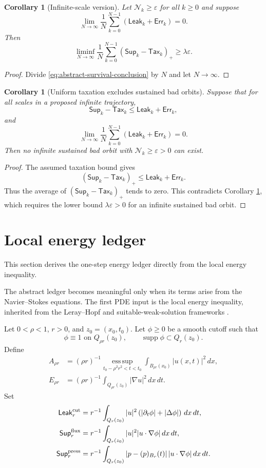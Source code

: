 \documentclass[11pt]{article}
\numberwithin{equation}{section}
\newtheorem{corollary}[theorem]{Corollary}
\newcommand{\eps}{\varepsilon}
\newcommand{\Supp}{\mathsf{Sup}}
\newcommand{\Tax}{\mathsf{Tax}}
\newcommand{\Leak}{\mathsf{Leak}}
\newcommand{\Err}{\mathsf{Err}}
\newcommand{\pos}[1]{\left(#1\right)_+}
\newcommand{\dd}{\,d}
\newcommand{\N}{\mathcal N}
\begin{document}
\begin{corollary}[Infinite-scale version]\label{cor:infinite}
Let $\N_k\geq \eps$ for all $k\geq0$ and suppose
\[
\lim_{N\to\infty}\frac1N\sum_{k=0}^{N-1}(\Leak_k+\Err_k)=0.
\]
Then
\[
\liminf_{N\to\infty}\frac1N\sum_{k=0}^{N-1}\pos{\Supp_k-\Tax_k}
\geq \lambda\eps.
\]
\end{corollary}

\begin{proof}
Divide \eqref{eq:abstract-survival-conclusion} by $N$ and let $N\to\infty$.
\end{proof}

\begin{corollary}[Uniform taxation excludes sustained bad orbits]\label{cor:taxation-excludes}
Suppose that for all scales in a proposed infinite trajectory,
\[
\Supp_k-\Tax_k\leq \Leak_k+\Err_k,
\]
and
\[
\lim_{N\to\infty}\frac1N\sum_{k=0}^{N-1}(\Leak_k+\Err_k)=0.
\]
Then no infinite sustained bad orbit with $\N_k\geq\eps>0$ can exist.
\end{corollary}

\begin{proof}
The assumed taxation bound gives
\[
\pos{\Supp_k-\Tax_k}\leq \Leak_k+\Err_k.
\]
Thus the average of $\pos{\Supp_k-\Tax_k}$ tends to zero.  This contradicts Corollary \ref{cor:infinite}, which requires the lower bound $\lambda\eps>0$ for an infinite sustained bad orbit.
\end{proof}

\section{Local energy ledger}\label{sec:local-energy-ledger}
\noindent This section derives the one-step energy ledger directly from the local energy inequality.

The abstract ledger becomes meaningful only when its terms arise from the Navier--Stokes equations.  The first PDE input is the local energy inequality, inherited from the Leray--Hopf and suitable-weak-solution frameworks \cite{Leray1934,Hopf1951,CKN1982}.

Let $0<\rho<1$, $r>0$, and $z_0=(x_0,t_0)$.  Let $\phi\geq0$ be a smooth cutoff such that
\[
\phi\equiv1 \text{ on } Q_{\rho r}(z_0),
\qquad
\operatorname{supp}\phi\subset Q_r(z_0).
\]
Define
\begin{align*}
A_{\rho r}
&=(\rho r)^{-1}\operatorname*{ess\,sup}_{t_0-\rho^2r^2<t<t_0}
\int_{B_{\rho r}(x_0)} |u(x,t)|^2\dd x,\\
E_{\rho r}
&=(\rho r)^{-1}\int_{Q_{\rho r}(z_0)}|\nabla u|^2\dd x\dd t.
\end{align*}
Set
\begin{align*}
\Leak_r^{\rm cut}
&=r^{-1}\int_{Q_r(z_0)} |u|^2\left(|\partial_t\phi|+|\Delta\phi|\right)\dd x\dd t,\\
\Supp_r^{\rm flux}
&=r^{-1}\int_{Q_r(z_0)} |u|^2|u\cdot\nabla\phi|\dd x\dd t,\\
\Supp_r^{\rm press}
&=r^{-1}\int_{Q_r(z_0)} |p-(p)_{B_r}(t)|\,|u\cdot\nabla\phi|\dd x\dd t.
\end{align*}
\end{document}

